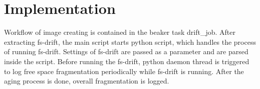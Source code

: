 \documentclass[
  color, %
  table, %
  lof,   %
  lot,   %
]{fithesis3}
\begin{document}





\section{Implementation}
Workflow of image creating is contained in the beaker task drift\_job. After extracting fs-drift, the main script starts python script, which handles the process of running fs-drift. Settings of fs-drift are passed as a parameter and are parsed inside the script. Before running the fs-drift, python daemon thread is triggered to log free space fragmentation periodically while fs-drift is running. After the aging process is done, overall fragmentation is logged.
\end{document}
